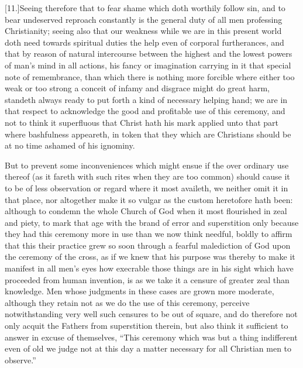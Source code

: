 [11.]Seeing therefore that to fear shame which doth worthily follow sin, and to bear undeserved reproach constantly is the general duty of all men professing Christianity; seeing also that our weakness while we are in this present world doth need towards spiritual duties the help even of corporal furtherances, and that by reason of natural intercourse between the highest and the lowest powers of man’s mind in all actions, his fancy or imagination carrying in it that special note of remembrance, than which there is nothing more forcible where either too weak or too strong a conceit of infamy and disgrace might do great harm, standeth always ready to put forth a kind of necessary helping hand; we are in that respect to acknowledge the good and profitable use of this ceremony, and not to think it superfluous that Christ hath his mark applied unto that part where bashfulness appeareth, in token that they which are Christians should be at no time ashamed of his ignominy.

But to prevent some inconveniences which might ensue if the over ordinary use thereof (as it fareth with such rites when they are too common) should cause it to be of less observation or regard where it most availeth, we neither omit it in that place, nor altogether make it so vulgar as the custom heretofore hath been: although to condemn the whole Church of God when it most flourished in zeal and piety, to mark that age with the brand of error and superstition only because they had this ceremony more in use than we now think needful, boldly to affirm that this their practice grew so soon through a fearful malediction of God upon the ceremony of  the cross,
 as if we knew that his purpose was thereby to make it manifest in all men’s eyes how execrable those things are in his sight which have proceeded from human invention, is as we take it a censure of greater zeal than knowledge. Men whose judgments in these cases are grown more moderate, although they retain not as we do the use of this ceremony, perceive notwithstanding very well such censures to be out of square, and do therefore not only acquit the Fathers from superstition therein, but also think it sufficient to answer in excuse of themselves, “This ceremony which was but a thing indifferent even of old we judge not at this day a matter necessary for all Christian men to observe.”

